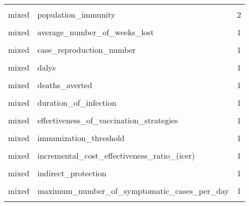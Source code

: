 \documentclass[
]{article}
\begin{document}
\begin{longtable}[t]{llr}
\cellcolor{gray!6}{mixed} & \cellcolor{gray!6}{peak\_incidence} & \cellcolor{gray!6}{2}\\
mixed & population\_immunity & 2\\
\cellcolor{gray!6}{mixed} & \cellcolor{gray!6}{average\_expected\_number\_of\_cases} & \cellcolor{gray!6}{1}\\
\addlinespace
mixed & average\_number\_of\_weeks\_lost & 1\\
\cellcolor{gray!6}{mixed} & \cellcolor{gray!6}{campaign\_duration} & \cellcolor{gray!6}{1}\\
mixed & case\_reproduction\_number & 1\\
\cellcolor{gray!6}{mixed} & \cellcolor{gray!6}{cumulative\_infected} & \cellcolor{gray!6}{1}\\
mixed & dalys & 1\\
\addlinespace
\cellcolor{gray!6}{mixed} & \cellcolor{gray!6}{deaths} & \cellcolor{gray!6}{1}\\
mixed & deaths\_averted & 1\\
\cellcolor{gray!6}{mixed} & \cellcolor{gray!6}{delay\_between\_epidemics} & \cellcolor{gray!6}{1}\\
mixed & duration\_of\_infection & 1\\
\cellcolor{gray!6}{mixed} & \cellcolor{gray!6}{effective\_reproduction\_number} & \cellcolor{gray!6}{1}\\
\addlinespace
mixed & effectiveness\_of\_vaccination\_strategies & 1\\
\cellcolor{gray!6}{mixed} & \cellcolor{gray!6}{extra\_protective\_rate} & \cellcolor{gray!6}{1}\\
mixed & immunization\_threshold & 1\\
\cellcolor{gray!6}{mixed} & \cellcolor{gray!6}{incremental\_cost\_effectiveness\_ratio} & \cellcolor{gray!6}{1}\\
mixed & incremental\_cost\_effectiveness\_ratio\_(icer) & 1\\
\addlinespace
\cellcolor{gray!6}{mixed} & \cellcolor{gray!6}{incremental\_net\_benefits} & \cellcolor{gray!6}{1}\\
mixed & indirect\_protection & 1\\
\cellcolor{gray!6}{mixed} & \cellcolor{gray!6}{instantaneous\_reproduction\_number} & \cellcolor{gray!6}{1}\\
mixed & maximum\_number\_of\_symptomatic\_cases\_per\_day & 1\\
\cellcolor{gray!6}{mixed} & \cellcolor{gray!6}{morbidity} & \cellcolor{gray!6}{1}\\

\end{longtable}
\end{document}
